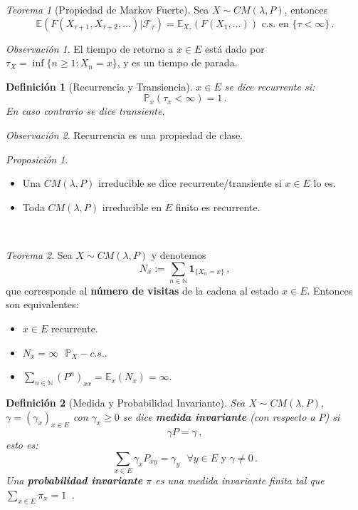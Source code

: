 \documentclass[letterpaper,11pt]{article} %
\theoremstyle{defbreak}
\newtheorem{definition}{Definición}[subsection]
\theoremstyle{propbreak}
\theoremstyle{remark}
\newtheorem{remark}{Observación}[subsection]
\theoremstyle{break}
\newtheorem{theorem}{Teorema}[subsection]
\newtheorem{proposition}{Proposición}[subsection]
\def\E{\mathbb{E}}
\def\P{\mathbb{P}}
\def\N{\mathbb{N}}
\def\beforeitemize{\leavevmode \vspace{-0.5\baselineskip}}
\def\cm{CM(\lambda,P)}
\begin{document}
\begin{theorem}[Propiedad de Markov Fuerte]
Sea $X\sim\cm$, entonces
$$ \E(F(X_{\tau+1},X_{\tau+2},\dots)|\mathcal{F}_\tau)=\E_{X_\tau}(F(X_1,\dots)) \mbox{ c.s. en }\{\tau<\infty\} \, .$$
\end{theorem}
\begin{remark}
El tiempo de retorno a $x\in E$ está dado por $\tau_X=\inf\{n\geq1:X_n=x\}$, y es un tiempo de parada.
\end{remark}
\begin{definition}[Recurrencia y Transiencia]
$x\in E$ se dice recurrente si:
$$ \P_x(\tau_x<\infty)=1 \, .$$
En caso contrario se dice transiente.
\end{definition}
\begin{remark}
Recurrencia es una propiedad de clase.
\end{remark}
\begin{proposition}
\beforeitemize
\begin{itemize}
    \item Una $CM(\lambda,P)$ irreducible se dice recurrente/transiente si $x\in E$ lo es.
    \item Toda $\cm$ irreducible en $E$ finito es recurrente.
\end{itemize}
\end{proposition}
\\ \vspace{3cm}
\begin{theorem}
\label{theorem:visitas}
Sea $X\sim\cm$ y denotemos
$$ N_x:=\displaystyle\sum_{n\in\N}\mathbf{1}_{\{X_n=x\}} \, ,$$
que corresponde al \textbf{número de visitas} de la cadena al estado $x\in E$.
\newline Entonces son equivalentes:
\begin{itemize}
    \item $x\in E$ recurrente.
    \item $N_x=\infty \mbox{ }\P_X-{ c.s.}$.
    \item $\displaystyle\sum_{n\in \N}(P^n)_{xx}=\E_x(N_x)=\infty$.
\end{itemize}
\end{theorem}
\begin{definition}[Medida y Probabilidad Invariante]
Sea $X\sim\cm$, $\gamma=(\gamma_x)_{x\in E}$ con $\gamma_x\geq0$ se dice \textbf{medida invariante} (con respecto a $P$) si
$$ \gamma P = \gamma \, ,$$
esto es:
$$ \sum_{x\in E}\gamma_xP_{xy}=\gamma_{y}\mbox{ }\forall y\in E \mbox{ y }\gamma\neq 0 \, .$$
Una \textbf{probabilidad invariante} $\pi$ es una medida invariante finita tal que $\sum_{x\in E}\pi_x = 1$ \,.
\end{definition}
\end{document}
